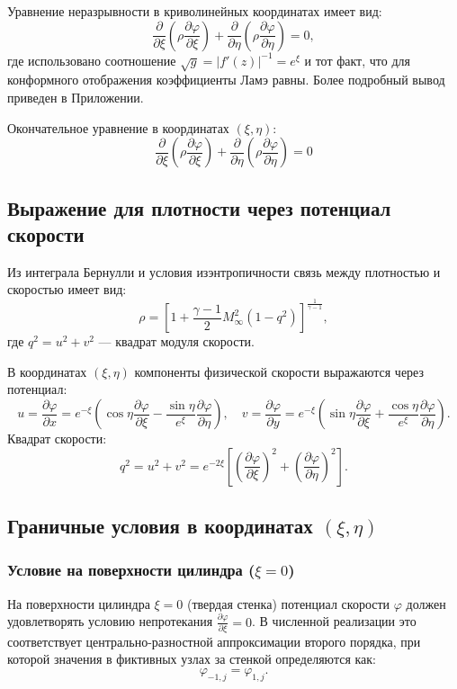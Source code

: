 	Уравнение неразрывности в криволинейных координатах имеет вид:
	\[
	\frac{\partial}{\partial \xi} \left( \rho \frac{\partial \varphi}{\partial \xi} \right) + \frac{\partial}{\partial \eta} \left( \rho \frac{\partial \varphi}{\partial \eta} \right) = 0,
	\]
	где использовано соотношение $\sqrt{g} = |f'(z)|^{-1} = e^{\xi}$ и тот факт, что для конформного отображения коэффициенты Ламэ равны. Более подробный вывод приведен в Приложении.
	
	Окончательное уравнение в координатах $(\xi, \eta)$:
	\begin{equation}
		\boxed{\frac{\partial}{\partial \xi} \left( \rho \frac{\partial \varphi}{\partial \xi} \right) + \frac{\partial}{\partial \eta} \left( \rho \frac{\partial \varphi}{\partial \eta} \right) = 0}
	\end{equation}
	
	\subsection{Выражение для плотности через потенциал скорости}
	Из интеграла Бернулли и условия изэнтропичности связь между плотностью и скоростью имеет вид:
	\[
	\rho = \left[ 1 + \frac{\gamma-1}{2} M_\infty^2 \left( 1 - q^2 \right) \right]^{\frac{1}{\gamma-1}},
	\]
	где $q^2 = u^2 + v^2$ — квадрат модуля скорости.
	
	В координатах $(\xi, \eta)$ компоненты физической скорости выражаются через потенциал:
	\[
	u = \frac{\partial \varphi}{\partial x} = e^{-\xi} \left( \cos\eta \frac{\partial \varphi}{\partial \xi} - \frac{\sin\eta}{e^{\xi}} \frac{\partial \varphi}{\partial \eta} \right), \quad
	v = \frac{\partial \varphi}{\partial y} = e^{-\xi} \left( \sin\eta \frac{\partial \varphi}{\partial \xi} + \frac{\cos\eta}{e^{\xi}} \frac{\partial \varphi}{\partial \eta} \right).
	\]
	Квадрат скорости:
	\[
	q^2 = u^2 + v^2 = e^{-2\xi} \left[ \left( \frac{\partial \varphi}{\partial \xi} \right)^2 + \left( \frac{\partial \varphi}{\partial \eta} \right)^2 \right].
	\]
	
	\subsection{Граничные условия в координатах \texorpdfstring{$(\xi, \eta)$}{(xi, eta)}}
	
	\subsubsection{Условие на поверхности цилиндра \texorpdfstring{($\xi = 0$)}{(xi = 0)}}
	На поверхности цилиндра $\xi = 0$ (твердая стенка) потенциал скорости $\varphi$ должен удовлетворять условию непротекания $\frac{\partial \varphi}{\partial \xi} = 0$. В численной реализации это соответствует центрально-разностной аппроксимации второго порядка, при которой значения в фиктивных узлах за стенкой определяются как:
	\[
	\varphi_{-1,j} = \varphi_{1,j}.
	\]
	
